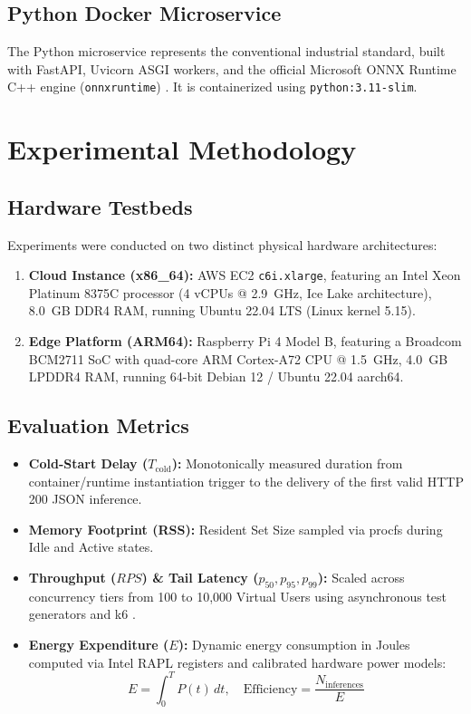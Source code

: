 \documentclass[conference]{IEEEtran}
\begin{document}
\subsection{Python Docker Microservice}
The Python microservice represents the conventional industrial standard, built with FastAPI, Uvicorn ASGI workers, and the official Microsoft ONNX Runtime C++ engine (\texttt{onnxruntime}) \cite{onnxruntime2021}. It is containerized using \texttt{python:3.11-slim}.

\section{Experimental Methodology}
\subsection{Hardware Testbeds}
Experiments were conducted on two distinct physical hardware architectures:
\begin{enumerate}
    \item \textbf{Cloud Instance (x86\_64):} AWS EC2 \texttt{c6i.xlarge}, featuring an Intel Xeon Platinum 8375C processor (4 vCPUs @ 2.9~GHz, Ice Lake architecture), 8.0~GB DDR4 RAM, running Ubuntu 22.04 LTS (Linux kernel 5.15).
    \item \textbf{Edge Platform (ARM64):} Raspberry Pi 4 Model B, featuring a Broadcom BCM2711 SoC with quad-core ARM Cortex-A72 CPU @ 1.5~GHz, 4.0~GB LPDDR4 RAM, running 64-bit Debian 12 / Ubuntu 22.04 aarch64.
\end{enumerate}

\subsection{Evaluation Metrics}
\begin{itemize}
    \item \textbf{Cold-Start Delay ($T_{\text{cold}}$):} Monotonically measured duration from container/runtime instantiation trigger to the delivery of the first valid HTTP 200 JSON inference.
    \item \textbf{Memory Footprint (RSS):} Resident Set Size sampled via procfs during Idle and Active states.
    \item \textbf{Throughput ($RPS$) \& Tail Latency ($p_{50}, p_{95}, p_{99}$):} Scaled across concurrency tiers from 100 to 10,000 Virtual Users using asynchronous test generators and k6 \cite{k6_load_2022}.
    \item \textbf{Energy Expenditure ($E$):} Dynamic energy consumption in Joules computed via Intel RAPL registers \cite{desrochers2016validating, khan2018rapl} and calibrated hardware power models:
    \begin{equation}
        E = \int_0^T P(t) \, dt, \quad \text{Efficiency} = \frac{N_{\text{inferences}}}{E}
    \end{equation}
\end{itemize}
\end{document}
